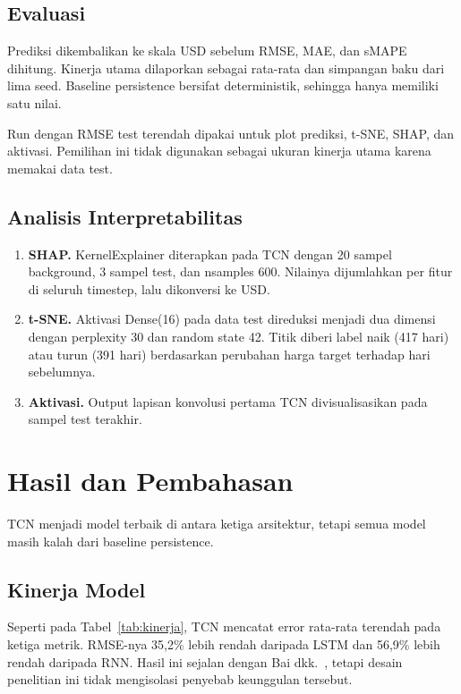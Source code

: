 \documentclass[conference,a4paper]{IEEEtran}
\begin{document}
\subsection{Evaluasi}
Prediksi dikembalikan ke skala USD sebelum RMSE, MAE, dan sMAPE dihitung. Kinerja utama dilaporkan sebagai rata-rata dan simpangan baku dari lima seed. Baseline persistence bersifat deterministik, sehingga hanya memiliki satu nilai.

Run dengan RMSE test terendah dipakai untuk plot prediksi, t-SNE, SHAP, dan aktivasi. Pemilihan ini tidak digunakan sebagai ukuran kinerja utama karena memakai data test.

\subsection{Analisis Interpretabilitas}
\begin{enumerate}
\item \textbf{SHAP.} KernelExplainer diterapkan pada TCN dengan 20 sampel background, 3 sampel test, dan nsamples 600. Nilainya dijumlahkan per fitur di seluruh timestep, lalu dikonversi ke USD.
\item \textbf{t-SNE.} Aktivasi Dense(16) pada data test direduksi menjadi dua dimensi dengan perplexity 30 dan random state 42. Titik diberi label naik (417 hari) atau turun (391 hari) berdasarkan perubahan harga target terhadap hari sebelumnya.
\item \textbf{Aktivasi.} Output lapisan konvolusi pertama TCN divisualisasikan pada sampel test terakhir.
\end{enumerate}

\section{Hasil dan Pembahasan}
TCN menjadi model terbaik di antara ketiga arsitektur, tetapi semua model masih kalah dari baseline persistence.

\subsection{Kinerja Model}
Seperti pada Tabel~\ref{tab:kinerja}, TCN mencatat error rata-rata terendah pada ketiga metrik. RMSE-nya 35,2\% lebih rendah daripada LSTM dan 56,9\% lebih rendah daripada RNN. Hasil ini sejalan dengan Bai dkk.~\cite{bai2018}, tetapi desain penelitian ini tidak mengisolasi penyebab keunggulan tersebut.
\end{document}
